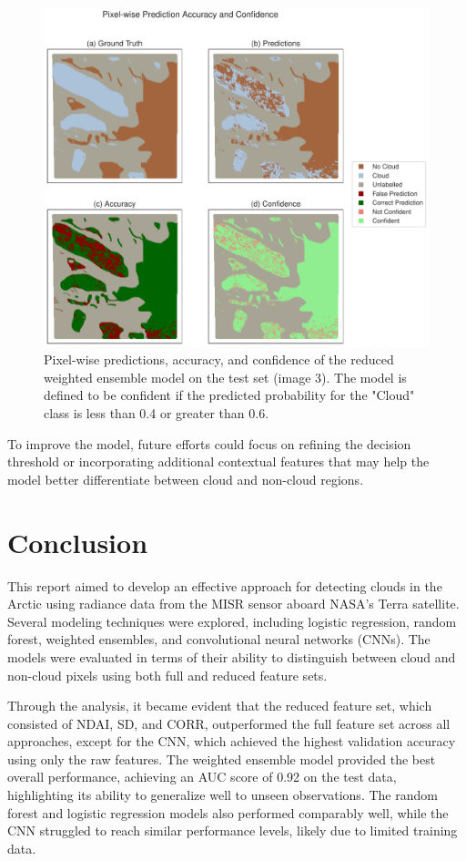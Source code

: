\documentclass[11pt,letterpaper]{article}
\begin{document}
\begin{figure}[H]
    \centering
    \includegraphics[width=\linewidth]{figs/error_analysis.pdf}
    \caption{Pixel-wise predictions, accuracy, and confidence of the reduced weighted ensemble model on the test set (image 3). The model is defined to be confident if the predicted probability for the "Cloud" class is less than 0.4 or greater than 0.6.}
    \label{fig_error_analysis}
\end{figure}

To improve the model, future efforts could focus on refining the decision threshold or incorporating additional contextual features that may help the model better differentiate between cloud and non-cloud regions.

\section{Conclusion}
This report aimed to develop an effective approach for detecting clouds in the Arctic using radiance data from the MISR sensor aboard NASA's Terra satellite. Several modeling techniques were explored, including logistic regression, random forest, weighted ensembles, and convolutional neural networks (CNNs). The models were evaluated in terms of their ability to distinguish between cloud and non-cloud pixels using both full and reduced feature sets.

Through the analysis, it became evident that the reduced feature set, which consisted of NDAI, SD, and CORR, outperformed the full feature set across all approaches, except for the CNN, which achieved the highest validation accuracy using only the raw features. The weighted ensemble model provided the best overall performance, achieving an AUC score of 0.92 on the test data, highlighting its ability to generalize well to unseen observations. The random forest and logistic regression models also performed comparably well, while the CNN struggled to reach similar performance levels, likely due to limited training data.
\end{document}
